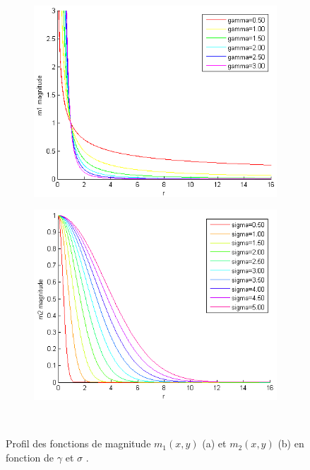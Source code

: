 \begin{figure}[!h]
   
   \begin{subfigure}[c]{.5\linewidth}
     \centering
     \includegraphics[scale=0.5]{Chapters/Images/graph_m1.png}
     \caption{}
     \label{gamma}
   \end{subfigure}
   \begin{subfigure}[c]{.5\linewidth}
     \centering
     \includegraphics[scale=0.5]{Chapters/Images/graph_m2.png}
     \caption{}
     \label{sigma}
   \end{subfigure}\\
   
   \caption{Profil des fonctions de magnitude  $m_1(x,y)$ (a) et $m_2(x,y)$ (b) en fonction de $\gamma$ et $\sigma$ .}
   \label{fig:profil}
\end{figure}

